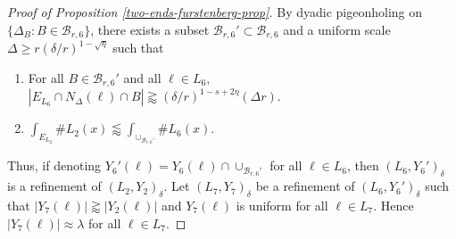 \documentclass{amsart}
\numberwithin{equation}{section}
\newcommand{\de}{\delta}
\newcommand{\De}{\Delta}
\newcommand{\la}{\lambda}
\newcommand{\cb}{\mathcal B}
\begin{document}
\begin{proof}[Proof of Proposition \ref{two-ends-furstenberg-prop}]
By dyadic pigeonholing on $\{\De_B: B\in\cb_{r,6}\}$, there exists a subset $\cb_{r,6}'\subset\cb_{r,6}$ and a uniform scale $\De\geq r(\de/r)^{1-\sqrt{\eta}}$ such that 
\begin{enumerate}
    \item For all $B\in\cb_{r,6}'$ and all $\ell\in L_6$, $|E_{L_6}\cap N_{\De}(\ell)\cap B|\gtrapprox  (\de/r)^{1-s+2\eta}(\De r)$.
    \item $ \int_{E_{L_2}}\# L_2(x)\lessapprox \int_{\cup_{\cb_{r,6}'}}\# L_6(x)$.
\end{enumerate}
Thus, if denoting $Y_6'(\ell)=Y_6(\ell)\cap\cup_{\cb_{r,6}'}$ for all $\ell\in L_6$, then $(L_6,Y_6')_\de$ is a refinement of $(L_2,Y_2)_\de$. 
Let $(L_7,Y_7)_\de$ be a refinement of $(L_6,Y_6')_\de$ such that $|Y_7(\ell)|\gtrapprox |Y_2(\ell)|$ and $Y_7(\ell)$ is uniform for all $\ell\in L_7$. 
Hence $|Y_7(\ell)|\approx \la$ for all $\ell\in L_7$. 


\smallskip



\end{proof}
\end{document}
